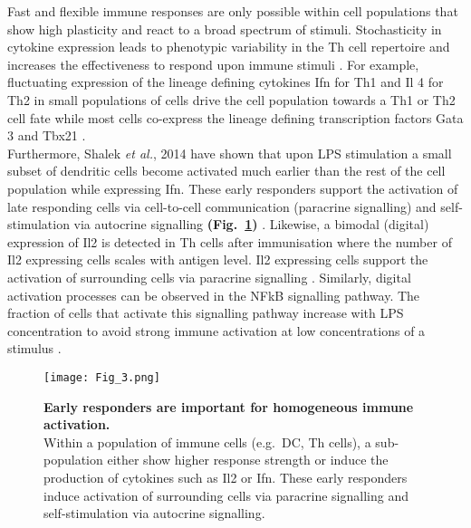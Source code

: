 Fast and flexible immune responses are only possible within cell populations that show high plasticity and react to a broad spectrum of stimuli. 
Stochasticity in cytokine expression leads to phenotypic variability in the \Gls{Th} cell repertoire and increases the effectiveness to respond upon immune stimuli \citep{Schrom2017}. 
For example, fluctuating expression of the lineage defining cytokines \gls{Ifn}\textgamma{} for Th1 and \gls{Il} 4 for Th2 in small populations of cells drive the cell population towards a Th1 or Th2 cell fate while most cells co-express the lineage defining transcription factors \Gls{Gata} 3 and \Gls{Tbx21} \citep{Fang2013a, Antebi2013}.\\

Furthermore, Shalek \textit{et al.}, 2014 have shown that upon \gls{LPS} stimulation a small subset of dendritic cells become activated much earlier than the rest of the cell population while expressing \gls{Ifn}\textbeta. 
These early responders support the activation of late responding cells via cell-to-cell communication (paracrine signalling) and self-stimulation via autocrine signalling \textbf{(Fig.~\ref{fig0:noise_immune})} \citep{Shalek2014}. 
Likewise, a bimodal (digital) expression of Il2 is detected in \gls{Th} cells after immunisation where the number of Il2 expressing cells scales with antigen level. 
Il2 expressing cells support the activation of surrounding cells via paracrine signalling \citep{Fuhrmann2016}. 
Similarly, digital activation processes can be observed in the \gls{NFkB} signalling pathway. 
The fraction of cells that activate this signalling pathway increase with LPS concentration to avoid strong immune activation at low concentrations of a stimulus \citep{Kellogg2015b}.

\begin{figure}[!h]
\centering
\texttt{[image: Fig\_3.png]}
\caption[Early responders are important for homogeneous immune activation]{\textbf{Early responders are important for homogeneous immune activation.}\\
Within a population of immune cells (e.g.~\gls{DC}, \gls{Th} cells), a sub-population either show higher response strength or induce the production of cytokines such as \gls{Il}2 or \gls{Ifn}\textbeta. 
These early responders induce activation of surrounding cells via paracrine signalling and self-stimulation via autocrine signalling.}
\label{fig0:noise_immune}
\end{figure}

\vspace{-5mm}

